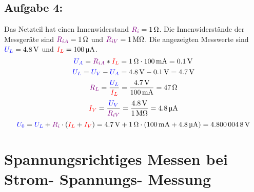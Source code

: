 \documentclass[11pt,a4paper,titlepage]{scrreprt}
\begin{document}
           \subsection{Aufgabe 4:}Das Netzteil hat einen Innenwiderstand $\textcolor{violet}{R_i} = \SI{1}{\ohm}$. Die Innenwiderstände der Messgeräte sind $\textcolor{violet}{R_{iA}} = \SI{1}{\ohm}$ und $\textcolor{violet}{R_{iV}} = \SI{1}{\mega\ohm}$. Die angezeigten Messwerte sind $\textcolor{blue}{U_L} = \SI{4,8}{\volt}$ und $\textcolor{red}{I_L} = \SI{100}{\micro\ampere}$.
           \begin{equation*}
           		\textcolor{blue}{U_A} = \textcolor{violet}{R_{iA}} * \textcolor{red}{I_L} = \SI{1}{\ohm} \cdot \SI{100}{\milli\ampere} = \SI{0,1}{\volt}
           \end{equation*}
           \begin{equation*}
           		\textcolor{blue}{U_L} = \textcolor{blue}{U_V} - \textcolor{blue}{U_A} = \SI{4,8}{\volt} - \SI{0,1}{\volt} = \SI{4,7}{\volt} 
           \end{equation*}
           \begin{equation*}
           		\textcolor{violet}{R_L} = \frac{\textcolor{blue}{U_L}}{\textcolor{red}{I_L}} = \frac{\SI{4,7}{\volt}}{\SI{100}{\milli\ampere}} = \SI{47}{\ohm}
           \end{equation*}
           \begin{equation*}
           		\textcolor{red}{I_V} = \frac{\textcolor{blue}{U_V}}{\textcolor{violet}{R_{iV}}} = \frac{\SI{4,8}{\volt}}{\SI{1}{\mega\ohm}} = \SI{4,8}{\micro\ampere}
           \end{equation*}
		   \begin{equation*}
		   		\textcolor{blue}{U_0} = \textcolor{blue}{U_L} + \textcolor{violet}{R_i} \cdot (\textcolor{red}{I_L} + \textcolor{red}{I_V}) = \SI{4,7}{\volt} + \SI{1}{\ohm} \cdot (\SI{100}{\milli\ampere} + \SI{4,8}{\micro\ampere}) = \SI{4,8000048}{\volt}
		   \end{equation*}
		   
       \section{Spannungsrichtiges Messen bei Strom- Spannungs- Messung}
       
\end{document}

